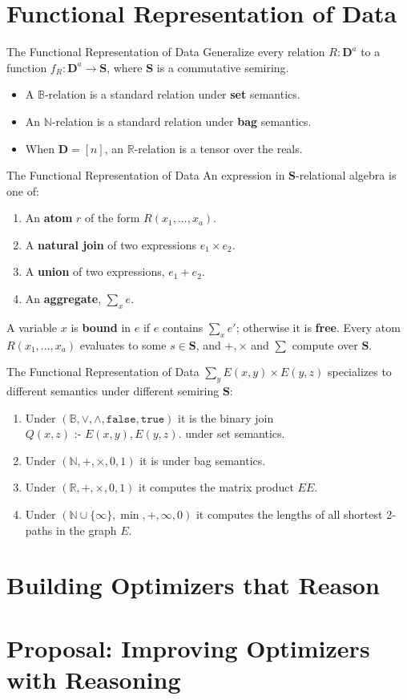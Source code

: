 \documentclass{beamer}
\newcommand{\B}{\mathbb B} %
\newcommand{\N}{\mathbb N} %
\newcommand{\R}{\mathbb R} %
\newcommand{\D}{\mathbf D} %
\newcommand{\SR}{\mathbf S} %
\newcommand{\dleq}{\mbox{ :- }}
\newcommand{\set}[1]{\{#1\}}                    %
\begin{document}
  \section{Functional Representation of Data}
  \begin{frame}{The Functional Representation of Data}
    Generalize every relation $R : \D^a$ to a function 
    $f_R : \D^a \rightarrow \SR$,
    where $\SR$ is a commutative semiring. \pause
    \begin{itemize}
      \item A $\B$-relation is a standard relation under \textbf{set} semantics. \pause
      \item An $\N$-relation is a standard relation under \textbf{bag} semantics. \pause
      \item When $\D = [n]$, an $\R$-relation is a tensor over the reals.
    \end{itemize}
  \end{frame}

  \begin{frame}{The Functional Representation of Data}
    An expression in $\SR$-relational algebra is one of:
    \begin{enumerate}
      \item An \textbf{atom} $r$ of the form $R(x_1, ..., x_a)$.
      \item A \textbf{natural join} of two expressions $e_1 \times e_2$.
      \item A \textbf{union} of two expressions, $e_1 + e_2$.
      \item An \textbf{aggregate},  $\sum_x e$.
    \end{enumerate} \pause
    A variable $x$ is \textbf{bound} in $e$ if $e$ contains $\sum_x e'$;
    otherwise it is \textbf{free}. \pause 
    Every atom $R(x_1, ..., x_a)$ evaluates to some $s \in \SR$, and
    $+, \times$ and $\sum$ compute over $\SR$.
  \end{frame}

  \begin{frame}{The Functional Representation of Data}
    $\sum_y E(x, y) \times E(y, z)$ specializes to 
    different semantics under different semiring $\SR$:
    \begin{enumerate}
      \item Under $(\mathbb{B},\vee, \wedge, \texttt{false}, \texttt{true})$
          it is the binary join $Q(x, z) \dleq E(x, y), E(y, z).$ 
          under set semantics. \pause
      \item Under $(\mathbb{N}, +, \times, 0, 1)$ it is under
          bag semantics. \pause
      \item Under $(\mathbb{R}, +, \times, 0, 1)$ it computes the matrix product $EE$. \pause
      \item Under $(\mathbb{N} \cup \set{\infty}, \min, +, \infty, 0)$ it computes the lengths
          of all shortest 2-paths in the graph $E$.
  \end{enumerate}
  
  \end{frame}

  \section{Building Optimizers that Reason}
  \section{Proposal: Improving Optimizers with Reasoning}
\end{document}
